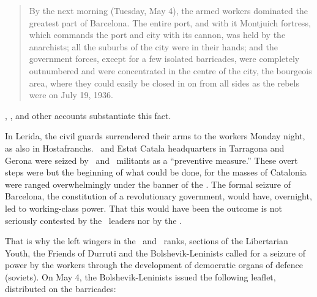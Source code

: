 \begin{quotation}
  By the next morning (Tuesday, May 4), the armed workers dominated the greatest part of Barcelona. The entire port, and with it Montjuich fortress, which commands the port and city with its cannon, was held by the anarchists; all the suburbs of the city were in their hands; and the government forces, except for a few isolated barricades, were completely outnumbered and were concentrated in the centre of the city, the bourgeois area, where they could easily be closed in on from all sides as the rebels were on July 19, 1936.
\end{quotation}

\CNT, \POUM, and other accounts substantiate this fact.

In Lerida, the civil guards surrendered their arms to the workers Monday night, as also in Hostafranchs. \PSUC\ and Estat Catala headquarters in Tarragona and Gerona were seized by \POUM\ and \CNT\ militants as a ``preventive measure.'' These overt steps were but the beginning of what could be done, for the masses of Catalonia were ranged overwhelmingly under the banner of the \CNT. The formal seizure of Barcelona, the constitution of a revolutionary government, would have, overnight, led to working-class power. That this would have been the outcome is not seriously contested by the \CNT\ leaders nor by the \POUM.

That is why the left wingers in the \CNT\ and \POUM\ ranks, sections of the Libertarian Youth, the Friends of Durruti and the Bolshevik-Leninists called for a seizure of power by the workers through the development of democratic organs of defence (soviets). On May 4, the Bolshevik-Leninists issued the following leaflet, distributed on the barricades:

\medskip


